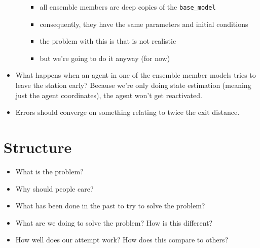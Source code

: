 \documentclass[12pt, twoside, a4paper]{report}
\begin{document}
\begin{itemize}
\begin{itemize}
\begin{itemize}
                    \item all ensemble members are deep copies of the
                        \texttt{base\_model}
                    \item consequently, they have the same parameters and
                        initial conditions
                    \item the problem with this is that is not realistic
                    \item but we're going to do it anyway (for now)
                \end{itemize}
        \end{itemize}
    \item What happens when an agent in one of the ensemble member models tries
        to leave the station early? Because we're only doing state estimation
        (meaning just the agent coordinates), the agent won't get reactivated.
    \item Errors should converge on something relating to twice the exit
        distance.
\end{itemize}

\section*{Structure}

\begin{itemize}
    \item What is the problem?
    \item Why should people care?
    \item What has been done in the past to try to solve the problem?
    \item What are we doing to solve the problem? How is this different?
    \item How well does our attempt work? How does this compare to others?
\end{itemize}











\begin{appendix}
    
\end{appendix}



\end{document}
